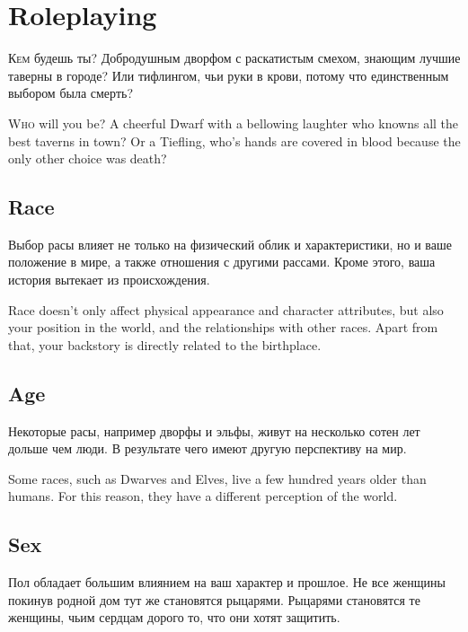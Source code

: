 \documentclass[a5paper,11pt]{book}
\begin{document}
\chapter{Roleplaying}
\begin{multicols}{2}
\begin{ru}
\lettrine{К}{ем} будешь ты? Добродушным дворфом с раскатистым смехом, знающим лучшие таверны в городе? Или тифлингом, чьи руки в крови, потому что единственным выбором была смерть?
\end{ru}

\begin{en}
\lettrine{W}{ho} will you be? A cheerful Dwarf with a bellowing laughter who knowns all the best taverns in town? Or a Tiefling, who's hands are covered in blood because the only other choice was death?
\end{en}

\section{Race}
\begin{ru}
Выбор расы влияет не только на физический облик и характеристики, но и ваше положение в мире, а также отношения с другими рассами. Кроме этого, ваша история вытекает из происхождения.
\end{ru}

\begin{en}
Race doesn't only affect physical appearance and character attributes, but also your position in the world, and the relationships with other races. Apart from that, your backstory is directly related to the birthplace.
\end{en}

\section{Age}
\begin{ru}
Некоторые расы, например дворфы и эльфы, живут на несколько сотен лет дольше чем люди. В результате чего имеют другую перспективу на мир.
\end{ru}

\begin{en}
Some races, such as Dwarves and Elves, live a few hundred years older than humans. For this reason, they have a different perception of the world.
\end{en}

\section{Sex}
\begin{ru}
Пол обладает большим влиянием на ваш характер и прошлое. Не все женщины покинув родной дом тут же становятся рыцарями. Рыцарями становятся те женщины, чьим сердцам дорого то, что они хотят защитить.
\end{ru}


\end{multicols}
\end{document}
